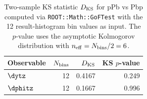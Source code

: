 \begin{table}[hbtp]
\centering
\begin{tabular}{|l|r|r|r|}
\hline
Observable & $N_{\rm bins}$ & $D_{\rm KS}$ & KS $p$-value \\
\hline
$\dytz$ & 12 & 0.4167 & 0.249 \\
$\dphitz$ & 12 & 0.1667 & 0.996 \\
\hline
\end{tabular}
\caption{Two-sample KS statistic $D_{\rm KS}$ for pPb vs Pbp computed via \texttt{ROOT::Math::GoFTest} with the 12 result-histogram bin values as input. The $p$-value uses the asymptotic Kolmogorov distribution with $n_{\rm eff} = N_{\rm bins}/2 = 6$.}
\label{table:combining_ks}
\end{table}
